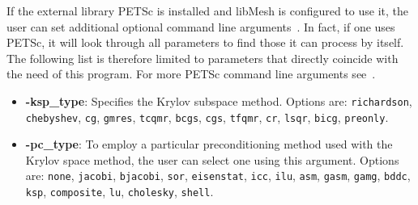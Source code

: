   If the external library PETSc is installed and libMesh is configured to use it, the user can set additional optional command line arguments~\cite{petsc-user-ref}. In fact, if one uses PETSc, it will look through all parameters to find those it can process by itself. The following list is therefore limited to parameters that directly coincide with the need of this program. For more PETSc command line arguments see~\cite{petsc-user-ref}.
  \begin{itemize}
  	\item \textbf{-ksp\_type}: Specifies the Krylov subspace method. Options are: \texttt{richardson}, \texttt{chebyshev}, \texttt{cg}, \texttt{gmres}, \texttt{tcqmr}, \texttt{bcgs}, \texttt{cgs}, \texttt{tfqmr}, \texttt{cr}, \texttt{lsqr}, \texttt{bicg}, \texttt{preonly}.
  	\item \textbf{-pc\_type}: To employ a particular preconditioning method used with the Krylov space method, the user can select one using this argument. Options are: \texttt{none}, \texttt{jacobi}, \texttt{bjacobi}, \texttt{sor}, \texttt{eisenstat}, \texttt{icc}, \texttt{ilu}, \texttt{asm}, \texttt{gasm}, \texttt{gamg}, \texttt{bddc}, \texttt{ksp}, \texttt{composite}, \texttt{lu}, \texttt{cholesky}, \texttt{shell}. 
  \end{itemize}
   
   
   
